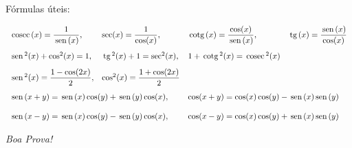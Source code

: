 \documentclass[a4paper,5pt]{amsbook}
\newcommand{\sen}{\,\mbox{sen}\,}
\newcommand{\tg}{\,\mbox{tg}\,}
\newcommand{\cosec}{\,\mbox{cosec}\,}
\newcommand{\cotg}{\,\mbox{cotg}\,}
\newcommand{\ds}{\displaystyle}
\begin{document}
\vfill{}
F\'ormulas \'uteis:

\[\begin{array}{llll}
	\vspace{0.3cm}
	\cosec(x) = \displaystyle\frac{1}{\sen(x)}, & \sec(x) = \displaystyle\frac{1}{\cos(x)}, & \cotg(x) = \displaystyle\frac{\cos(x)}{\sen(x)}, & \ds\tg(x) = \frac{\sen(x)}{\cos(x)}\\
	\vspace{0.3cm}
	\sen^2(x) + \cos^2(x) = 1, & \tg^2(x) + 1 = \sec^2(x), & 1 + \cotg^2(x) = \cosec^2(x) & \\
	\vspace{0.3cm}
	\sen^2(x) = \displaystyle\frac{1 - \cos(2x)}{2}, & \cos^2(x) = \displaystyle\frac{1 + \cos(2x)}{2} & & \\
	\multicolumn{2}{l}{\sen(x+y) = \displaystyle\sen(x)\cos(y) + \sen(y)\cos(x),} & \multicolumn{2}{l}{\cos(x+y) = \displaystyle\cos(x)\cos(y) - \sen(x)\sen(y)} \\
	& & & \\
	\multicolumn{2}{l}{\sen(x-y) = \displaystyle\sen(x)\cos(y) - \sen(y)\cos(x),} & \multicolumn{2}{l}{\cos(x-y) = \displaystyle\cos(x)\cos(y) + \sen(x)\sen(y)}
\end{array}\]

\begin{flushright}
	\vspace{1cm}
	\textit{Boa Prova!}
\end{flushright}
\end{document}
